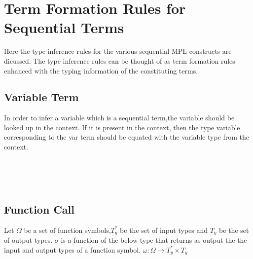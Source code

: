 \documentclass[11pt]{article}
\begin{document}
\section {Term Formation Rules for Sequential Terms}
Here the type inference rules for the various sequential MPL constructs are dicussed. The type inference rules can be thought of as term formation rules enhanced with the typing information of the constituting terms.
\subsection {Variable Term}
In order to infer a variable which is a sequential term,the variable should be looked up in the context. If it is present in the context, then the type variable corresponding to the var term should be equated with the variable type from the context.
~~\\~~\\
\begin{mdframed} [style=MyFrame,userdefinedwidth=8cm,align=center,
                  frametitle=Typing rule for variable ,frametitlerule=true,
                  frametitlerulewidth = 1pt
                 ]
  { 
  }
\end{mdframed}
~~\\~~\\
\subsection {Function Call}
Let $\Omega$ be a set of function symbols,$T_y^*$ be the set of input types and $T_y$ be the set of output types. $\sigma$ is a function of the below type that returns as output the the input and output types of a function symbol.
$\omega : \Omega \to T_y^* \times T_y$
\end{document}
